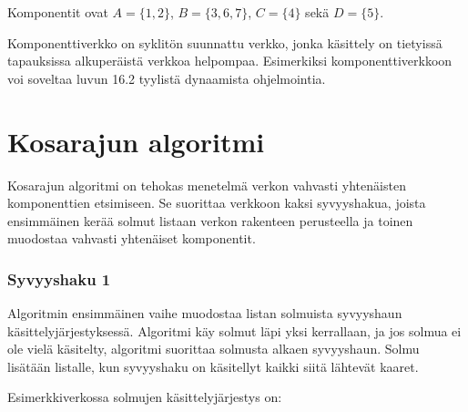 Komponentit ovat $A=\{1,2\}$,
$B=\{3,6,7\}$, $C=\{4\}$ sekä $D=\{5\}$.

Komponenttiverkko on syklitön suunnattu verkko,
jonka käsittely on tietyissä tapauksissa
alkuperäistä verkkoa helpompaa.
Esimerkiksi komponenttiverkkoon voi soveltaa
luvun 16.2 tyylistä dynaamista ohjelmointia.

\section{Kosarajun algoritmi}


Kosarajun algoritmi on tehokas
menetelmä verkon
vahvasti yhtenäisten komponenttien etsimiseen.
Se suorittaa verkkoon
kaksi syvyyshakua, joista ensimmäinen
kerää solmut listaan verkon rakenteen perusteella
ja toinen muodostaa vahvasti yhtenäiset komponentit.

\subsubsection{Syvyyshaku 1}

Algoritmin ensimmäinen vaihe muodostaa listan solmuista
syvyyshaun käsittelyjärjestyksessä.
Algoritmi käy solmut läpi yksi kerrallaan,
ja jos solmua ei ole vielä käsitelty, algoritmi suorittaa
solmusta alkaen syvyyshaun.
Solmu lisätään listalle, kun syvyyshaku on 
käsitellyt kaikki siitä lähtevät kaaret.

Esimerkkiverkossa solmujen käsittelyjärjestys on:
\begin{center}
\end{center}


